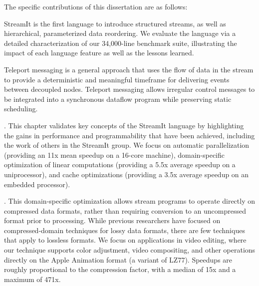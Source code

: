 The specific contributions of this dissertation are as follows:

\mybegin

  StreamIt is the first language to introduce
  structured streams, as well as hierarchical, parameterized data
  reordering.  We evaluate the language via a detailed
  characterization of our 34,000-line benchmark suite, illustrating
  the impact of each language feature as well as the lessons learned.

  Teleport messaging is a general approach that uses
  the flow of data in the stream to provide a deterministic and
  meaningful timeframe for delivering events between decoupled nodes.
  Teleport messaging allows irregular control messages to be
  integrated into a synchronous dataflow program while preserving
  static scheduling.

.  This chapter validates key concepts of the StreamIt
  language by highlighting the gains in performance and
  programmability that have been achieved, including the work of
  others in the StreamIt group.  We focus on automatic parallelization
  (providing an 11x mean speedup on a 16-core machine),
  domain-specific optimization of linear computations (providing a
  5.5x average speedup on a uniprocessor), and cache optimizations
  (providing a 3.5x average speedup on an embedded processor).

.  This domain-specific
  optimization allows stream programs to operate directly on
  compressed data formats, rather than requiring conversion to an
  uncompressed format prior to processing.  While previous researchers
  have focused on compressed-domain techniques for lossy data formats,
  there are few techniques that apply to lossless formats.  We focus
  on applications in video editing, where our technique supports color
  adjustment, video compositing, and other operations directly on the
  Apple Animation format (a variant of LZ77).  Speedups are roughly
  proportional to the compression factor, with a median of 15x and a
  maximum of 471x.

